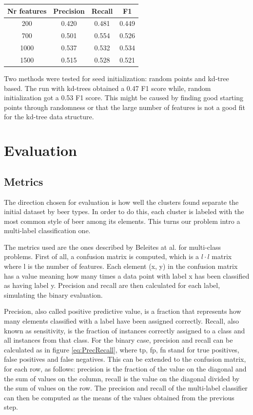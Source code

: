 \documentclass[12pt]{article}
\begin{document}
	\begin{center}
		\label{tab:features}
		\begin{tabular}{ |c|c|c|c| } 
			\hline
			Nr features & Precision & Recall & F1 \\
			\hline
			200 & 0.420 & 0.481 & 0.449 \\
			700 & 0.501 & 0.554 & 0.526 \\
			1000 & 0.537 & 0.532 & 0.534 \\
			1500 & 0.515 & 0.528 & 0.521 \\
			\hline
		\end{tabular}
	\end{center}

	Two methods were tested for seed initialization: random points and kd-tree based. The run with kd-trees obtained a 0.47 F1 score while, random initialization got a 0.53 F1 score. This might be caused by finding good starting points through randomness or that the large number of features is not a good fit for the kd-tree data structure.

	\section{Evaluation}
	\subsection{Metrics}
	The direction chosen for evaluation is how well the clusters found separate the initial dataset by beer types. In order to do this, each cluster is labeled with the most common style of beer among its elements. This turns our problem intro a multi-label classification one.
	
	The metrics used are the ones described by Beleites at al.\cite{MultilabelClassification} for multi-class problems. First of all, a confusion matrix is computed, which is a $l\cdot l$ matrix where l is the number of features. Each element (x, y) in the confusion matrix has a value meaning how many times a data point with label x has been classified as having label y. Precision and recall are then calculated for each label, simulating the binary evaluation. 
	
	Precision, also called positive predictive value, is a fraction that represents how many elements classified with a label have been assigned correctly. Recall, also known as sensitivity, is the fraction of instances correctly assigned to a class and all instances from that class. For the binary case, precision and recall can be calculated as in figure \ref{eq:PrecRecall}, where tp, fp, fn stand for true positives, false positives and false negatives. This can be extended to the confusion matrix, for each row, as follows: precision is the fraction of the value on the diagonal and the sum of values on the column, recall is the value on the diagonal divided by the sum of values on the row. The precision and recall of the multi-label classifier can then be computed as the means of the values obtained from the previous step.
	
\end{document}
